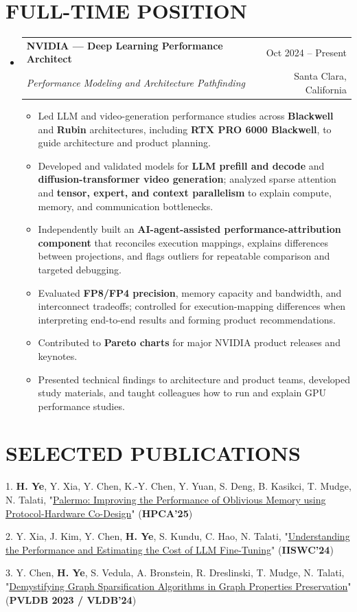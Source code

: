 \documentclass[a4paper,12pt]{article}
\makeatletter
\newcommand{\resumeItem}[1]{\item\small{{#1 \vspace{-1pt}}}}
\newcommand{\resumeSubheading}[4]{
  \vspace{-1pt}\item
    \begin{tabular*}{\textwidth}[t]{l@{\extracolsep{\fill}}r}
      \textbf{#1} & {\color{dark-grey}\small #2}\vspace{1pt}\\
      \textit{#3} & {\color{dark-grey} \small #4}\\
    \end{tabular*}\vspace{-4pt}
}
\newcommand{\resumeSubHeadingListStart}{\begin{itemize}[leftmargin=0in, label={}]}
\newcommand{\resumeSubHeadingListEnd}{\end{itemize}}
\newcommand{\resumeItemListStart}{\begin{itemize}}
\newcommand{\resumeItemListEnd}{\end{itemize}\vspace{0pt}}
\makeatother
\begin{document}
\section{FULL-TIME POSITION}
\resumeSubHeadingListStart
\resumeSubheading
{NVIDIA --- Deep Learning Performance Architect}{Oct 2024 -- Present}
{Performance Modeling and Architecture Pathfinding}{Santa Clara, California}
\resumeItemListStart
\resumeItem{Led LLM and video-generation performance studies across \textbf{Blackwell} and \textbf{Rubin} architectures, including \textbf{RTX PRO 6000 Blackwell}, to guide architecture and product planning.}
\resumeItem{Developed and validated models for \textbf{LLM prefill and decode} and \textbf{diffusion-transformer video generation}; analyzed sparse attention and \textbf{tensor, expert, and context parallelism} to explain compute, memory, and communication bottlenecks.}
\resumeItem{Independently built an \textbf{AI-agent-assisted performance-attribution component} that reconciles execution mappings, explains differences between projections, and flags outliers for repeatable comparison and targeted debugging.}
\resumeItem{Evaluated \textbf{FP8/FP4 precision}, memory capacity and bandwidth, and interconnect tradeoffs; controlled for execution-mapping differences when interpreting end-to-end results and forming product recommendations.}
\resumeItem{Contributed to \textbf{Pareto charts} for major NVIDIA product releases and keynotes.}
\resumeItem{Presented technical findings to architecture and product teams, developed study materials, and taught colleagues how to run and explain GPU performance studies.}
\resumeItemListEnd
\resumeSubHeadingListEnd

\section{SELECTED PUBLICATIONS}
1. \textbf{H. Ye}, Y. Xia, Y. Chen, K.-Y. Chen, Y. Yuan, S. Deng, B. Kasikci, T. Mudge, N. Talati, "\href{https://doi.org/10.1109/HPCA61900.2025.00038}{Palermo: Improving the Performance of Oblivious Memory using Protocol-Hardware Co-Design}" (\textbf{HPCA'25})

2. Y. Xia, J. Kim, Y. Chen, \textbf{H. Ye}, S. Kundu, C. Hao, N. Talati, "\href{https://doi.org/10.1109/IISWC63097.2024.00027}{Understanding the Performance and Estimating the Cost of LLM Fine-Tuning}" (\textbf{IISWC'24})

3. Y. Chen, \textbf{H. Ye}, S. Vedula, A. Bronstein, R. Dreslinski, T. Mudge, N. Talati, "\href{https://doi.org/10.14778/3632093.3632106}{Demystifying Graph Sparsification Algorithms in Graph Properties Preservation}" (\textbf{PVLDB 2023 / VLDB'24})
\end{document}
